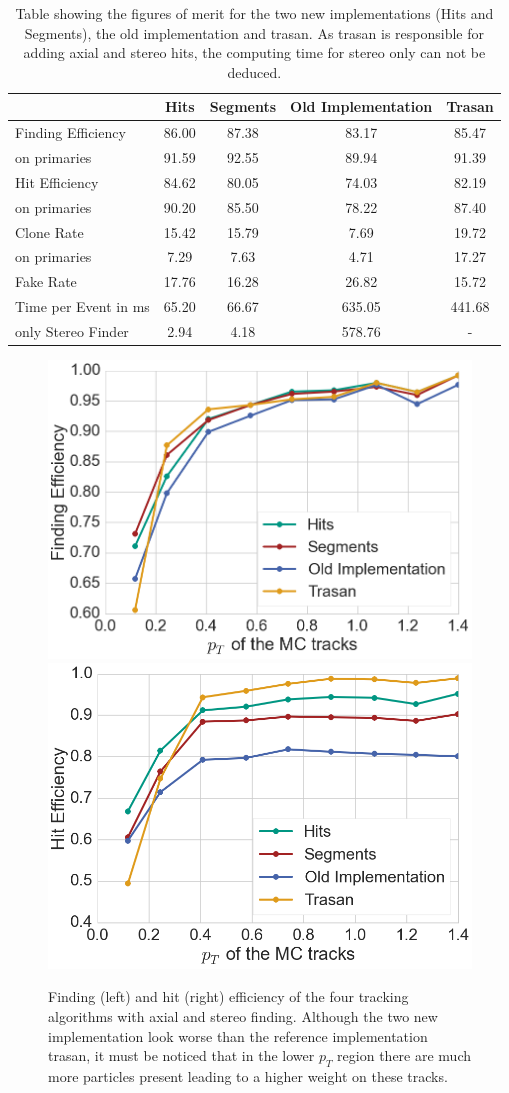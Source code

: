 \begin{table}
  \caption{Table showing the figures of merit for the two new implementations (Hits and Segments), the old implementation and trasan. As trasan is responsible for adding axial and stereo hits, the computing time for stereo only can not be deduced.}
  \centering
  \begin{tabular}{lcccc} \toprule
    & Hits & Segments & Old Implementation & Trasan \\ \midrule
    Finding Efficiency & 86.00 & 87.38 & 83.17 & 85.47 \\
    \quad on primaries & 91.59 & 92.55 & 89.94 & 91.39 \\ 
    Hit Efficiency     & 84.62 & 80.05 & 74.03 & 82.19 \\
    \quad on primaries & 90.20 & 85.50 & 78.22 & 87.40 \\ 
    Clone Rate         & 15.42 & 15.79 & 7.69  & 19.72 \\
    \quad on primaries & 7.29  & 7.63  & 4.71  & 17.27 \\ 
    Fake Rate          & 17.76 & 16.28 & 26.82 & 15.72 \\ 
    Time per Event in ms & 65.20 & 66.67 & 635.05 & 441.68 \\ 
    \quad only Stereo Finder & 2.94 & 4.18 & 578.76 & - \\ \bottomrule
  \end{tabular}
  \label{tab-stereo-results}
\end{table}

\begin{figure}
  \includegraphics[width=0.48\linewidth]{figures/workflow/stereo_finding_efficiency.png}
  \includegraphics[width=0.48\linewidth]{figures/workflow/stereo_hit_efficiency.png}
  \caption{Finding (left) and hit (right) efficiency of the four tracking algorithms with axial and stereo finding. Although the two new implementation look worse than the reference implementation trasan, it must be noticed that in the lower $p_T$ region there are much more particles present leading to a higher weight on these tracks.}
  \label{fig-stereo-results}
\end{figure}

